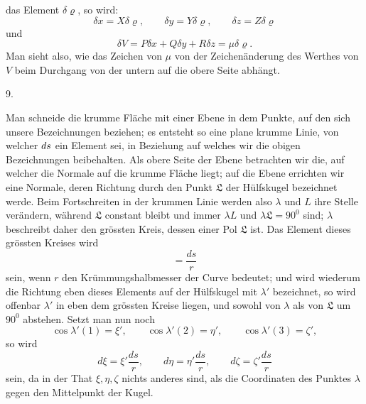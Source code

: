 %
das Element $\delta\varrho$, so wird:
\[
\delta x=X\delta\varrho,\qquad\delta y=Y\delta\varrho,\qquad\delta z=Z\delta\varrho
\]
und
\[
\delta V=P\delta x+Q\delta y+R\delta z=\mu\delta\varrho.
\]
Man sieht also, wie das Zeichen von $\mu$ von der Zeichenänderung des Werthes von $V$ beim Durchgang von der untern auf die obere Seite abhängt.

\begin{center}9.\end{center}
\noindent\hspace*{1.2em}Man schneide die krumme Fläche mit einer Ebene in dem Punkte, auf den sich unsere Bezeichnungen beziehen; es entsteht so eine plane krumme Linie, von welcher $ds\mathord{\hbox{}}$ ein Element sei, in Beziehung auf welches wir die obigen Bezeichnungen beibehalten. Als obere Seite der Ebene betrachten wir die, auf welcher die Normale auf die krumme Fläche liegt; auf die Ebene errichten wir eine Normale, deren Richtung durch den Punkt $\mathfrak{L}$ der Hülfskugel bezeichnet werde. Beim Fortschreiten in der krummen Linie werden also $\lambda$ und $L$ ihre Stelle verändern, während $\mathfrak{L}$ constant bleibt und immer $\lambda L$ und $\lambda\mathfrak{L}=90^{0}$ sind; $\lambda$ beschreibt daher den grössten Kreis, dessen einer Pol $\mathfrak{L}$ ist. Das Element dieses grössten Kreises wird
\[
=\frac{ds}{r}
\]
sein, wenn $r$ den Krümmungshalbmesser der Curve bedeutet; und wird wiederum die Richtung eben dieses Elements auf der Hülfskugel mit $\lambda'$ bezeichnet, so wird offenbar $\lambda'$ in eben dem grössten Kreise liegen, und sowohl von $\lambda$ als von $\mathfrak{L}$ um $90^{0}$ abstehen. Setzt man nun noch
\[
\cos\lambda'(1)=\xi',\qquad\cos\lambda'(2)=\eta',\qquad\cos\lambda'(3)=\zeta',
\]
so wird
\[
d\xi=\xi'\frac{ds}{r},\qquad d\eta=\eta'\frac{ds}{r},\qquad d\zeta=\zeta'\frac{ds}{r}
\]
sein, da in der That $\xi,\eta,\zeta$ nichts anderes sind, als die Coordinaten des Punktes $\lambda$ gegen den Mittelpunkt der Kugel.
